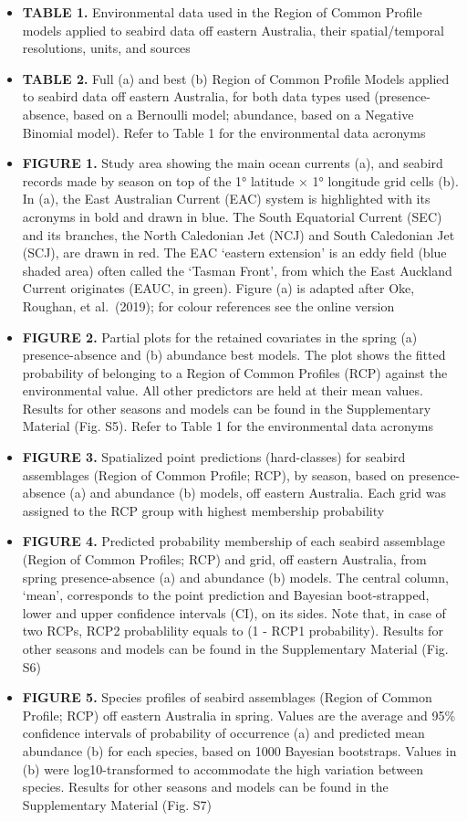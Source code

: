 \documentclass{article}
\providecommand{\tightlist}{%
  \setlength{\itemsep}{0pt}\setlength{\parskip}{0pt}}
\begin{document}
\begin{itemize}
\tightlist
\item
  \textbf{TABLE 1.} Environmental data used in the Region of Common Profile models applied to seabird data off eastern Australia, their spatial/temporal resolutions, units, and sources
\item
  \textbf{TABLE 2.} Full (a) and best (b) Region of Common Profile Models applied to seabird data off eastern Australia, for both data types used (presence-absence, based on a Bernoulli model; abundance, based on a Negative Binomial model). Refer to Table 1 for the environmental data acronyms
\item
  \textbf{FIGURE 1.} Study area showing the main ocean currents (a), and seabird records made by season on top of the 1° latitude × 1° longitude grid cells (b). In (a), the East Australian Current (EAC) system is highlighted with its acronyms in bold and drawn in blue. The South Equatorial Current (SEC) and its branches, the North Caledonian Jet (NCJ) and South Caledonian Jet (SCJ), are drawn in red. The EAC `eastern extension' is an eddy field (blue shaded area) often called the `Tasman Front', from which the East Auckland Current originates (EAUC, in green). Figure (a) is adapted after Oke, Roughan, et al.~(2019); for colour references see the online version
\item
  \textbf{FIGURE 2.} Partial plots for the retained covariates in the spring (a) presence-absence and (b) abundance best models. The plot shows the fitted probability of belonging to a Region of Common Profiles (RCP) against the environmental value. All other predictors are held at their mean values. Results for other seasons and models can be found in the Supplementary Material (Fig. S5). Refer to Table 1 for the environmental data acronyms
\item
  \textbf{FIGURE 3.} Spatialized point predictions (hard-classes) for seabird assemblages (Region of Common Profile; RCP), by season, based on presence-absence (a) and abundance (b) models, off eastern Australia. Each grid was assigned to the RCP group with highest membership probability
\item
  \textbf{FIGURE 4.} Predicted probability membership of each seabird assemblage (Region of Common Profiles; RCP) and grid, off eastern Australia, from spring presence-absence (a) and abundance (b) models. The central column, `mean', corresponds to the point prediction and Bayesian boot-strapped, lower and upper confidence intervals (CI), on its sides. Note that, in case of two RCPs, RCP2 probablility equals to (1 - RCP1 probability). Results for other seasons and models can be found in the Supplementary Material (Fig. S6)
\item
  \textbf{FIGURE 5.} Species profiles of seabird assemblages (Region of Common Profile; RCP) off eastern Australia in spring. Values are the average and 95\% confidence intervals of probability of occurrence (a) and predicted mean abundance (b) for each species, based on 1000 Bayesian bootstraps. Values in (b) were log10-transformed to accommodate the high variation between species. Results for other seasons and models can be found in the Supplementary Material (Fig. S7)
\end{itemize}
\end{document}
